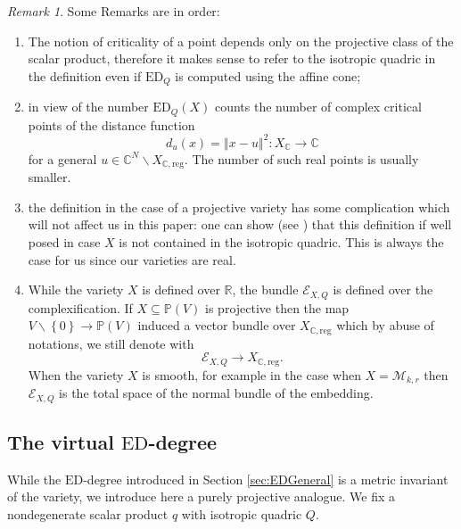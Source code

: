 \documentclass[11pt]{article}
\numberwithin{equation}{section}
\numberwithin{figure}{section}
\theoremstyle{plain}
\theoremstyle{definition}
\theoremstyle{remark}
\newtheorem{rem}[thm]{Remark}
\newcommand{\su}{\subseteq}
\newcommand{\R}{\mathbb{R}}
\newcommand{\C}{\mathbb{C}}
\renewcommand{\P}{\mathbb{P}}
\newcommand{\ED}{\mathrm{ED}}
\begin{document}
\begin{rem}\label{rem:ED}
Some Remarks are in order:
\begin{enumerate}
\item The notion of criticality of a point depends only on the projective class of the scalar product, therefore it makes sense to refer to the isotropic quadric in the definition even if $\ED_Q$ is computed using the affine cone;
\item in view of \cite{DHOST} the number $\ED_Q\left(X\right)$ counts the
number of complex critical points of the distance function
\[
d_{u}\left(x\right)=\left\Vert x-u\right\Vert ^{2}:X_{\C}\to\C
\]
for a general $u\in\C^{N}\backslash X_{\C,{\mathrm{reg}}}$. The number
of such real points is usually smaller.
\item \label{item:isotropicQuadric} the definition in the case of a projective variety has some complication which will not affect us in this paper: one can show (see \cite[Lemma 2.8 and Corollary 2.9]{DHOST}) that this definition if well posed in case $X$ is not contained in the isotropic quadric. This is always the case for us since our varieties are real.
\item While the variety $X$ is defined over $\R$, the bundle $\mathcal{E}_{X,Q}$
is defined over the complexification. If $X\su\P\left(V\right)$ is
projective then the map $V\backslash\left\{ 0\right\} \to\P\left(V\right)$
induced a vector bundle over $X_{\C,\mathrm{reg}}$ which by abuse
of notations, we still denote with
\[
\mathcal{E}_{X,Q}\to X_{\C,\mathrm{reg}}.
\]
When the variety $X$ is smooth, for example in the case when $X=\mathcal{M}_{k,r}$
then $\mathcal{E}_{X,Q}$ is the total space of the normal bundle of
the embedding.
\end{enumerate}
\end{rem}

\subsection{The virtual $\ED$-degree}\label{sec:vED}

While the $\ED$-degree introduced in Section \ref{sec:EDGeneral} is a metric invariant of the variety, we introduce here a purely projective analogue. We fix a nondegenerate scalar product $q$ with isotropic quadric $Q$.
\end{document}
